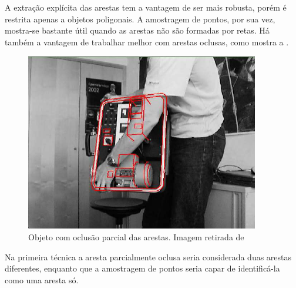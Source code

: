 A extração explícita das arestas tem a vantagem de ser mais robusta, porém é restrita apenas a objetos poligonais. A amostragem de pontos, por sua vez, mostra-se bastante útil quando as arestas não são formadas por retas. Há também a vantagem de trabalhar melhor com arestas oclusas, como mostra a .

\begin{figure}[ht!]
\centering
\includegraphics{monografia/occlusion.png}
\caption{Objeto com oclusão parcial das arestas. Imagem retirada de \cite{wuest}}
\label{occlusion}
\end{figure}

Na primeira técnica a aresta parcialmente oclusa seria considerada duas arestas diferentes, enquanto que a amostragem de pontos seria capar de identificá-la como uma aresta só.

